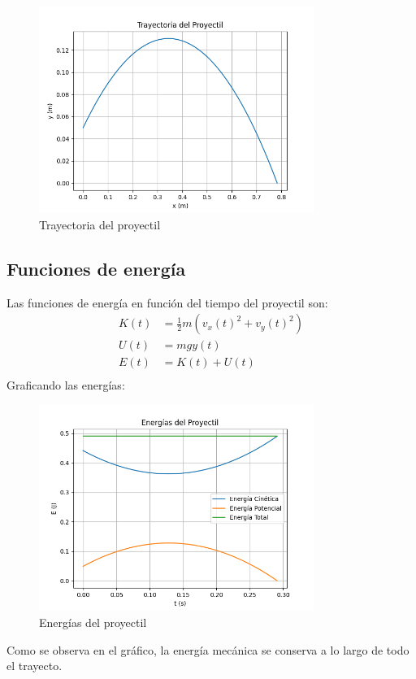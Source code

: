 \documentclass{article}
\begin{document}
        \begin{figure}[H]
            \centering
            \includegraphics[width=0.8\textwidth]{figures/trayectoria.png}
            \caption{Trayectoria del proyectil}
        \end{figure}
        
        \subsection{Funciones de energía}
        Las funciones de energía en función del tiempo del proyectil son:
        \begin{align*}
            K(t) &= \frac{1}{2} m (v_x(t)^2 + v_y(t)^2) \\
            U(t) &= m g y(t) \\
            E(t) &= K(t) + U(t) \\
        \end{align*}
        Graficando las energías:
        \begin{figure}[H]
            \centering
            \includegraphics[width=0.8\textwidth]{figures/energia.png}
            \caption{Energías del proyectil}
        \end{figure}
        Como se observa en el gráfico, la energía mecánica se conserva a lo largo de todo el trayecto.
        
\end{document}
